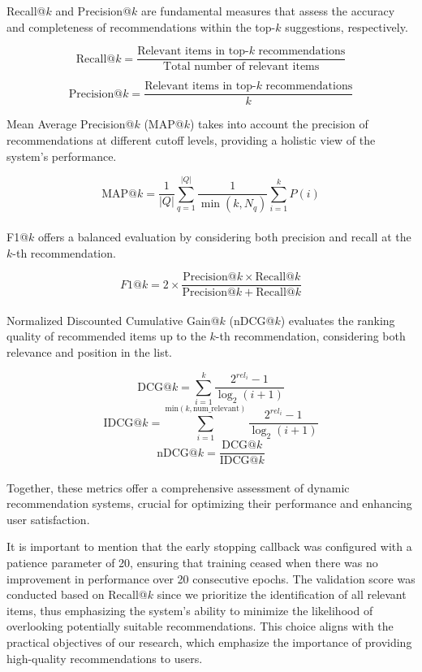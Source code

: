 \documentclass{scrartcl}
\begin{document}
Recall@$k$ and Precision@$k$ are fundamental measures that assess the accuracy and completeness of recommendations within the top-$k$ suggestions, respectively. 

\[
\text{Recall@}k = \frac{\text{Relevant items in top-} k\text{ recommendations}}{\text{Total number of relevant items}}
\]

\[
\text{Precision@}k = \frac{\text{Relevant items in top-} k\text{ recommendations}}{k}
\]

Mean Average Precision@$k$ (MAP@$k$) takes into account the precision of recommendations at different cutoff levels, providing a holistic view of the system's performance. 

\[
\text{MAP@}k = \frac{1}{|Q|} \sum_{q=1}^{|Q|} \frac{1}{\min(k, N_q)} \sum_{i=1}^k P(i)
\] \\ 

F1@$k$ offers a balanced evaluation by considering both precision and recall at the $k$-th recommendation. 

\[ F1@k = 2 \times \frac{\text{Precision@$k$} \times \text{Recall@$k$}}{\text{Precision@$k$} + \text{Recall@$k$}} \] \\ 

Normalized Discounted Cumulative Gain@$k$ (nDCG@$k$) evaluates the ranking quality of recommended items up to the $k$-th recommendation, considering both relevance and position in the list. 

\[ \text{DCG@$k$} = \sum_{i=1}^{k} \frac{2^{rel_i} - 1}{\log_2(i+1)} \]
\[ \text{IDCG@$k$} = \sum_{i=1}^{\text{min}(k, \text{num\_relevant})} \frac{2^{rel_i} - 1}{\log_2(i+1)} \]
\[ \text{nDCG@$k$} = \frac{\text{DCG@$k$}}{\text{IDCG@$k$}} \] \\ 

Together, these metrics offer a comprehensive assessment of dynamic recommendation systems, crucial for optimizing their performance and enhancing user satisfaction.

It is important to mention that the early stopping callback was configured with a patience parameter of 20, ensuring that training ceased when there was no improvement in performance over 20 consecutive epochs. The validation score was conducted based on Recall@$k$ since we prioritize the identification of all relevant items, thus emphasizing the system's ability to minimize the likelihood of overlooking potentially suitable recommendations. This choice aligns with the practical objectives of our research, which emphasize the importance of providing high-quality recommendations to users.
\end{document}
